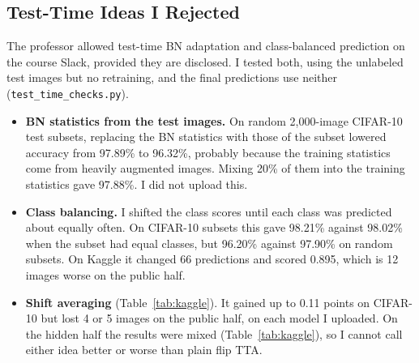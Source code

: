 \documentclass[letterpaper]{article}
\begin{document}
\subsection{Test-Time Ideas I Rejected}
The professor allowed test-time BN adaptation \cite{schneider2020improving} and class-balanced prediction on the course
Slack, provided they are disclosed. I tested both, using the unlabeled test images but no retraining, and the final
predictions use neither (\texttt{test\_time\_checks.py}).
\begin{itemize}
\item \textbf{BN statistics from the test images.} On random 2,000-image CIFAR-10 test subsets, replacing the BN
statistics with those of the subset lowered accuracy from 97.89\% to 96.32\%, probably because the training statistics
come from heavily augmented images. Mixing 20\% of them into the training statistics gave 97.88\%. I did not upload this.
\item \textbf{Class balancing.} I shifted the class scores until each class was predicted about equally often. On
CIFAR-10 subsets this gave 98.21\% against 98.02\% when the subset had equal classes, but 96.20\% against 97.90\% on
random subsets. On Kaggle it changed 66 predictions and scored 0.895, which is 12 images worse on the public half.
\item \textbf{Shift averaging} (Table~\ref{tab:kaggle}). It gained up to 0.11 points on CIFAR-10 but lost 4 or 5 images
on the public half, on each model I uploaded. On the hidden half the results were mixed (Table~\ref{tab:kaggle}), so I
cannot call either idea better or worse than plain flip TTA.
\end{itemize}
\end{document}
